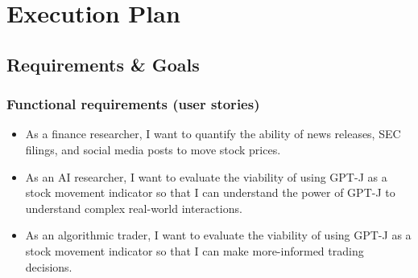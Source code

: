 \documentclass[conference]{IEEEtran}
\begin{document}
\section{Execution Plan}
\subsection{Requirements \& Goals}
\subsubsection{Functional requirements (user stories)}
\begin{itemize}
\item As a finance researcher, I want to quantify the ability of news releases, SEC filings, and social media posts to move stock prices.
\item As an AI researcher, I want to evaluate the viability of using GPT-J as a stock movement indicator so that I can understand the power of GPT-J to understand complex real-world interactions.
\item As an algorithmic trader, I want to evaluate the viability of using GPT-J as a stock movement indicator so that I can make more-informed trading decisions.
\end{itemize}
\end{document}
